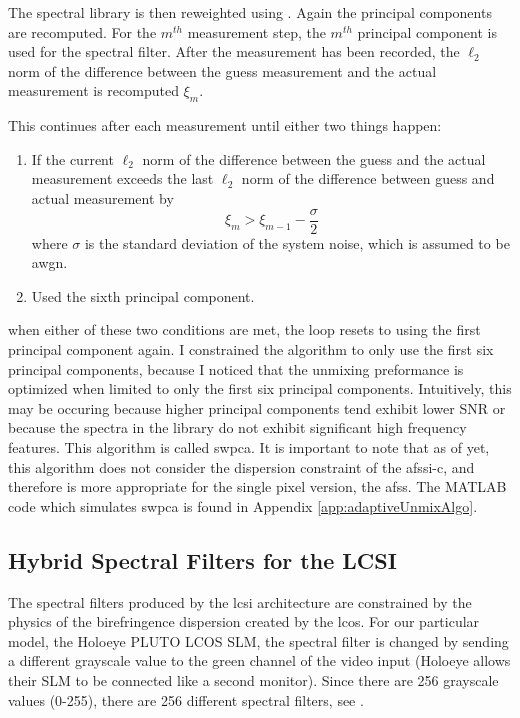 The spectral library is then reweighted using . Again the principal components are recomputed. For the $m^{th}$ measurement step, the $m^{th}$ principal component is used for the spectral filter. After the measurement has been recorded, the  $\ell_2$ norm of the difference between the guess measurement and the actual measurement is recomputed $\xi_m$. 


This continues after each measurement until either two things happen: 
\begin{enumerate}
	\item If the current $\ell_2$ norm of the difference between the guess and the actual measurement exceeds the last $\ell_2$ norm of the difference between guess and actual measurement by
	\begin{equation}
		\xi_m > \xi_{m-1} - \frac{\sigma}{2}
	\end{equation}	
	where $\sigma$ is the standard deviation of the system noise, which is assumed to be \gls{awgn}.

	\item Used the sixth principal component.
\end{enumerate}

when either of these two conditions are met, the loop resets to using the first principal component again. I constrained the algorithm to only use the first six principal components, because I noticed that the unmixing preformance is optimized when limited to only the first six principal components. Intuitively, this may be occuring because higher principal components tend exhibit lower SNR or because the spectra in the library do not exhibit significant high frequency features. This algorithm is called \acrfull{swpca}. It is important to note that as of yet, this algorithm does not consider the dispersion constraint of the \gls{afssi-c}, and therefore is more appropriate for the single pixel version, the \gls{afss}. The MATLAB code which simulates \gls{swpca} is found in Appendix \ref{app:adaptiveUnmixAlgo}.


\subsection{Hybrid Spectral Filters for the LCSI}\label{ssec:hybridFiltersLCSI}

The spectral filters produced by the \gls{lcsi} architecture are constrained by the physics of the birefringence dispersion created by the \gls{lcos}. For our particular model, the Holoeye PLUTO LCOS SLM, the spectral filter is changed by sending a different grayscale value to the green channel of the video input (Holoeye allows their SLM to be connected like a second monitor). Since there are 256 grayscale values (0-255), there are 256 different spectral filters, see . 

